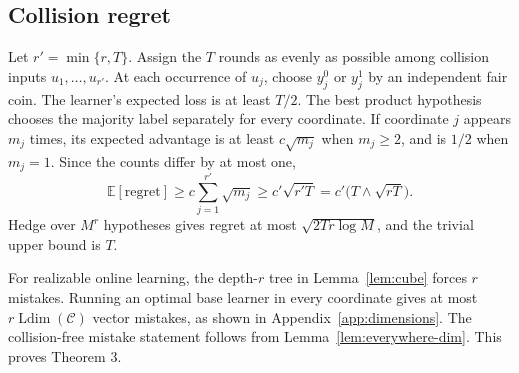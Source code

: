\documentclass[twoside]{article}
\newcommand{\E}{\mathbb E}
\newcommand{\C}{\mathcal C}
\newcommand{\Ldim}{\operatorname{Ldim}}
\begin{document}
\subsection{Collision regret}

Let $r'=\min\{r,T\}$. Assign the $T$ rounds as evenly as possible among collision inputs $u_1,\ldots,u_{r'}$. At each occurrence of $u_j$, choose $y_j^0$ or $y_j^1$ by an independent fair coin. The learner's expected loss is at least $T/2$. The best product hypothesis chooses the majority label separately for every coordinate. If coordinate $j$ appears $m_j$ times, its expected advantage is at least $c\sqrt{m_j}$ when $m_j\geq2$, and is $1/2$ when $m_j=1$. Since the counts differ by at most one,
\[
 \E[\text{regret}]\geq c\sum_{j=1}^{r'}\sqrt{m_j}
 \geq c'\sqrt{r'T}
 =c'\bigl(T\wedge\sqrt{rT}\bigr).
\]
Hedge over $M^r$ hypotheses gives regret at most $\sqrt{2Tr\log M}$, and the trivial upper bound is $T$.

For realizable online learning, the depth-$r$ tree in Lemma~\ref{lem:cube} forces $r$ mistakes. Running an optimal base learner in every coordinate gives at most $r\Ldim(\C)$ vector mistakes, as shown in Appendix~\ref{app:dimensions}. The collision-free mistake statement follows from Lemma~\ref{lem:everywhere-dim}. This proves Theorem 3.


\end{document}
